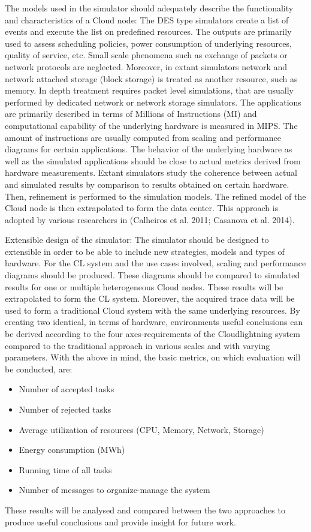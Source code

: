 The models used in the simulator should adequately describe the functionality and characteristics of a Cloud node: The DES type simulators create a list of events and execute the list on predefined resources. The outputs are primarily used to assess scheduling policies, power consumption of underlying resources, quality of service, etc. Small scale phenomena such as exchange of packets or network protocols are neglected. Moreover, in extant simulators network and network attached storage (block storage) is treated as another resource, such as memory. In depth treatment requires packet level simulations, that are usually performed by dedicated network or network storage simulators. The applications are primarily described in terms of Millions of Instructions (MI) and computational capability of the underlying hardware is measured in MIPS. The amount of instructions are usually computed from scaling and performance diagrams for certain applications. The behavior of the underlying hardware as well as the simulated applications should be close to actual metrics derived from hardware measurements. Extant simulators study the coherence between actual and simulated results by comparison to results obtained on certain hardware. Then, refinement is performed to the simulation models. The refined model of the Cloud node is then extrapolated to form the data center. This approach is adopted by various researchers in (Calheiros et al. 2011; Casanova et al. 2014).

Extensible design of the simulator: The simulator should be designed to extensible in order to be able to include new strategies, models and types of hardware. For the CL system and the use cases involved, scaling and performance diagrams should be produced. These diagrams should be compared to simulated results for one or multiple heterogeneous Cloud nodes.  These results will be extrapolated to form the CL system. Moreover, the acquired trace data will be used to form a traditional Cloud system with the same underlying resources. By creating two identical, in terms of hardware, environments useful conclusions can be derived according to the four axes-requirements of the Cloudlightning system compared to the traditional approach in various scales and with varying parameters. With the above in mind, the basic metrics, on which evaluation will be conducted, are:

\begin{itemize}
\item Number of accepted tasks
\item Number of rejected tasks
\item Average utilization of resources (CPU, Memory, Network, Storage)
\item Energy consumption (MWh)
\item Running time of all tasks
\item Number of messages to organize-manage the system
\end{itemize}

These results will be analysed and compared between the two approaches to produce useful conclusions and provide insight for future work.

